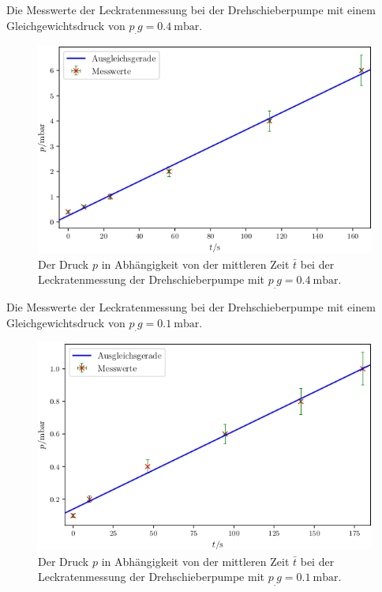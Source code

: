 \newpage
\begin{table}
\centering
\caption{Die Messwerte der Leckratenmessung bei der Drehschieberpumpe mit einem Gleichgewichtsdruck von $p_.g = \SI{0.4}{\milli\bar}$.}

\label{tab:DL3}
\end{table}

\begin{figure}
\centering
\includegraphics[width=\linewidth-70pt,height=\textheight-70pt,keepaspectratio]{content/images/DL3.png}
\caption{Der Druck $p$ in Abhängigkeit von der mittleren Zeit $\bar{t}$ bei der Leckratenmessung der Drehschieberpumpe  mit $p_.g = \SI{0.4}{\milli\bar}$.}
\label{fig:DL3}
\end{figure}

\begin{table}
\centering
\caption{Die Messwerte der Leckratenmessung bei der Drehschieberpumpe mit einem Gleichgewichtsdruck von $p_.g = \SI{0.1}{\milli\bar}$.}

\label{tab:DL4}
\end{table}

\begin{figure}
\centering
\includegraphics[width=\linewidth-70pt,height=\textheight-70pt,keepaspectratio]{content/images/DL4.png}
\caption{Der Druck $p$ in Abhängigkeit von der mittleren Zeit $\bar{t}$ bei der Leckratenmessung der Drehschieberpumpe  mit $p_.g = \SI{0.1}{\milli\bar}$.}
\label{fig:DL4}
\end{figure}

